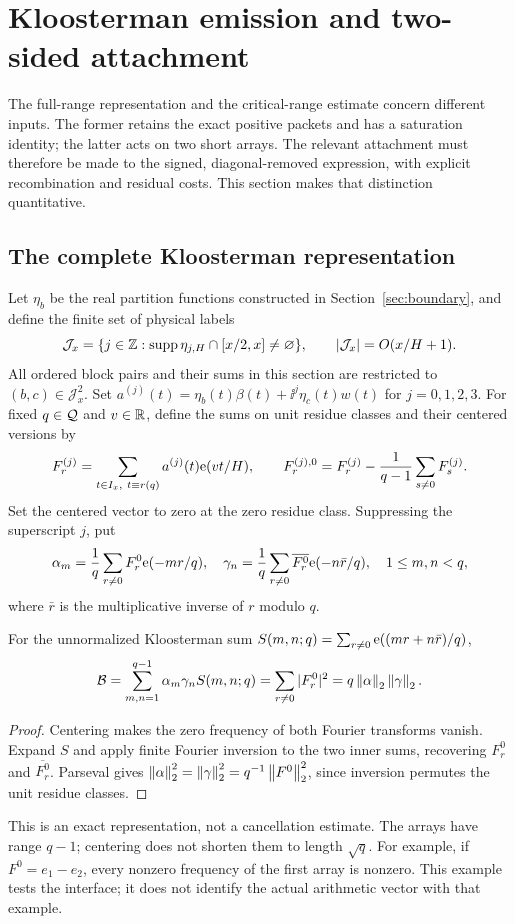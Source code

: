 \section{Kloosterman emission and two-sided attachment}\label{sec:emitter}
The full-range representation and the critical-range estimate concern different inputs. The former retains the exact positive packets and has a saturation identity; the latter acts on two short arrays. The relevant attachment must therefore be made to the signed, diagonal-removed expression, with explicit recombination and residual costs. This section makes that distinction quantitative.
\subsection{The complete Kloosterman representation}
Let $\eta_b$ be the real partition functions constructed in Section~\ref{sec:boundary}, and define the finite set of physical labels
\[
\mathcal J_x=\{j\in\mathbb Z:\operatorname{supp}\eta_{j,H}\cap[x/2,x]\ne\varnothing\},
\qquad |\mathcal J_x|=O(x/H+1).
\]
All ordered block pairs and their sums in this section are restricted to $(b,c)\in\mathcal J_x^2$. Set
$a^{(j)}(t)=\eta_b(t)\beta(t)+\ii^j\eta_c(t)w(t)$ for $j=0,1,2,3$.
For fixed $q\in\mathcal Q$ and $v\in\mathbb R$, define the sums on unit residue classes and their centered versions by
\[
F_r^{(j)}=\sum_{t\in I_x,\ t\equiv r(q)}a^{(j)}(t)\mathrm e(vt/H),\qquad
F_r^{(j),0}=F_r^{(j)}-\frac1{q-1}\sum_{s\ne0}F_s^{(j)}.
\]
Set the centered vector to zero at the zero residue class. Suppressing the superscript $j$, put
\[
\alpha_m=\frac1q\sum_{r\ne0}F_r^0\mathrm e(-mr/q),\quad
\gamma_n=\frac1q\sum_{r\ne0}\overline{F_r^0}\mathrm e(-n\bar r/q),\quad 1\le m,n<q,
\]
where $\bar r$ is the multiplicative inverse of $r$ modulo $q$.
\begin{proposition}\label{prop:emitter}
For the unnormalized Kloosterman sum $S(m,n;q)=\sum_{r\ne0}\mathrm e((mr+n\bar r)/q)$,
\[
\mathcal B=\sum_{m,n=1}^{q-1}\alpha_m\gamma_nS(m,n;q)
=\sum_{r\ne0}|F_r^0|^2
=q\left\|\alpha\right\|_2\left\|\gamma\right\|_2.
\]
\end{proposition}
\begin{proof}
Centering makes the zero frequency of both Fourier transforms vanish. Expand $S$ and apply finite Fourier inversion to the two inner sums, recovering $F_r^0$ and $\overline{F_r^0}$. Parseval gives
$\left\|\alpha\right\|_2^2=\left\|\gamma\right\|_2^2=q^{-1}\left\|F^0\right\|_2^2$, since inversion permutes the unit residue classes.
\end{proof}
This is an exact representation, not a cancellation estimate. The arrays have range $q-1$; centering does not shorten them to length $\sqrt q$. For example, if $F^0=e_1-e_2$, every nonzero frequency of the first array is nonzero. This example tests the interface; it does not identify the actual arithmetic vector with that example.

